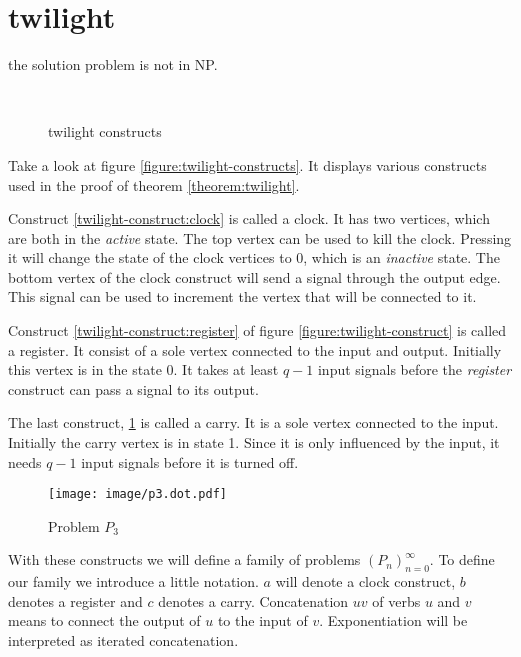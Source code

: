 \section{twilight}
\begin{theorem}\label{theorem:twilight}
    the solution problem is not in NP.
\end{theorem}

\begin{figure}\label{figure:twilight-constructs}
  \mbox{
    \label{twilight-construct:clock}
    \label{twilight-construct:register}
    \label{twilight-construct:carry}
   }
  \caption{twilight constructs}
\end{figure}

Take a look at figure \ref{figure:twilight-constructs}. It displays various constructs used in the proof of theorem \ref{theorem:twilight}.

Construct \ref{twilight-construct:clock} is called a clock. It has two vertices, which are both in the \emph{active} state. The top vertex can be used to kill the clock. Pressing it will change the state of the clock vertices to 0, which is an \emph{inactive} state.
The bottom vertex of the clock construct will send a signal through the output edge. This signal can be used to increment the vertex that will be connected to it. 

Construct \ref{twilight-construct:register} of figure \ref{figure:twilight-construct} is called a register. It consist of a sole vertex connected to the input and output. Initially this vertex is in the state 0. It takes at least $q-1$ input signals before the \emph{register} construct can pass a signal to its output.

The last construct, \ref{twilight-construct:carry} is called a carry. It is a sole vertex connected to the input. Initially the carry vertex is in state 1. Since it is only influenced by the input, it needs $q-1$ input signals before it is turned off.

\begin{figure}
  \texttt{[image: image/p3.dot.pdf]}
  \caption{Problem $P_{3}$}\label{figure:p3}
\end{figure}

With these constructs we will define a family of problems $\left(P_{n}\right)_{n=0}^{\infty}$. To define our family we introduce a little notation. $a$ will denote a clock construct, $b$ denotes a register and $c$ denotes a carry. Concatenation $uv$ of verbs $u$ and $v$ means to connect the output of $u$ to the input of $v$. Exponentiation will be interpreted as iterated concatenation.

